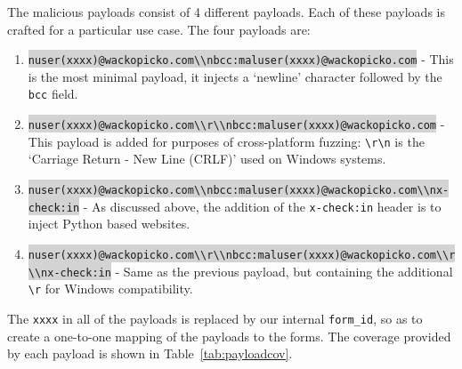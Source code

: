The malicious payloads consist of 4 different payloads. Each of these payloads is crafted for a particular use case. The four payloads are:
\lstset{language=html}
\begin{enumerate}
	\item
	\colorbox{lightgray}{\lstinline{nuser(xxxx)@wackopicko.com\\nbcc:maluser(xxxx)@wackopicko.com}} - This is the most minimal payload, it injects a `newline' character followed by the \texttt{bcc} field.
	\item \colorbox{lightgray}{\lstinline{nuser(xxxx)@wackopicko.com\\r\\nbcc:maluser(xxxx)@wackopicko.com}} - This payload is added for purposes of cross-platform fuzzing: \texttt{\textbackslash{}r\textbackslash{}n} is the `Carriage Return - New Line (CRLF)' used on Windows systems. 
	\item \colorbox{lightgray}{\lstinline{nuser(xxxx)@wackopicko.com\\nbcc:maluser(xxxx)@wackopicko.com\\nx-check:in}} - As discussed above, the addition of the \texttt{x-check:in} header is to inject Python based websites.
	\item \colorbox{lightgray}{\lstinline{nuser(xxxx)@wackopicko.com\\r\\nbcc:maluser(xxxx)@wackopicko.com\\r\\nx-check:in}} - Same as the previous payload, but containing the additional \texttt{\textbackslash{}r} for Windows compatibility.
	
\end{enumerate}
The \texttt{xxxx} in all of the payloads is replaced by our internal \texttt{form\_id}, so as to create a one-to-one mapping of the payloads to the forms. The coverage provided by each payload is shown in Table~\ref{tab:payloadcov}.\\


